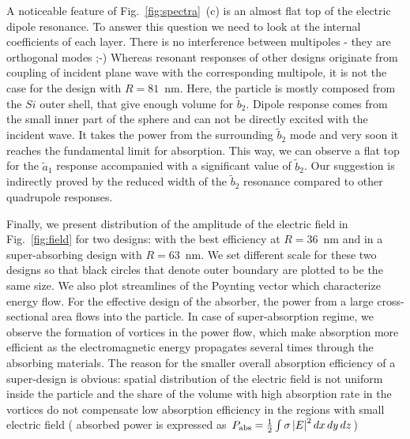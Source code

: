 \documentclass[aps,prl,twocolumn,showpacs,superscriptaddress,groupedaddress]{revtex4-1}
\begin{document}
A noticeable feature of Fig.~\ref{fig:spectra}~(c) is an almost flat
top of the electric dipole resonance.
To answer this question we need to look at the internal coefficients of each layer.
There is no interference between multipoles - they are orthogonal modes ;-)
 Whereas resonant responses
of other designs originate from coupling of incident plane wave with
the corresponding multipole, it is not the case for the design with
$R=81$~nm. Here, the particle is mostly composed from the $Si$ outer
shell, that give enough volume for $\tilde{b}_2$.  Dipole response
comes from the small inner part of the sphere and can not be directly
excited with the incident wave.  It takes the power from the
surrounding $\tilde{b}_2$ mode and very soon it reaches the
fundamental limit for absorption.  This way, we can observe a flat top
for the $\tilde{a}_1$ response accompanied with a significant value of
$\tilde{b}_2$.  Our suggestion is indirectly proved by the reduced
width of the $\tilde{b}_2$ resonance compared to other quadrupole
responses.

\begin{figure}
\end{figure}
%
Finally, we present distribution of the amplitude of the electric
field in Fig.~\ref{fig:field} for two designs: with the best
efficiency at $R=36$~nm and in a super-absorbing design with
$R=63$~nm.  We set different scale for these two designs so that black
circles that denote outer boundary are plotted to be the same size.
We also plot streamlines of the Poynting vector which characterize
energy flow. For the effective design of the absorber, the power from
a large cross-sectional area flows into the particle.  In case of
super-absorption regime, we observe the formation of vortices in the power flow, which make
absorption more efficient as the electromagnetic energy propagates
several times through the absorbing materials.  The reason for the
smaller overall absorption efficiency of a super-design is obvious:
spatial distribution of the electric field is not uniform inside the
particle and the share of the volume with high absorption rate in the
vortices do not compensate low absorption efficiency in the regions
with small electric field ( absorbed power is expressed as $P_{\rm
  abs}=\frac{1}{2}\int\sigma \left|E\right|^2dx\,dy\,dz$)
\end{document}
